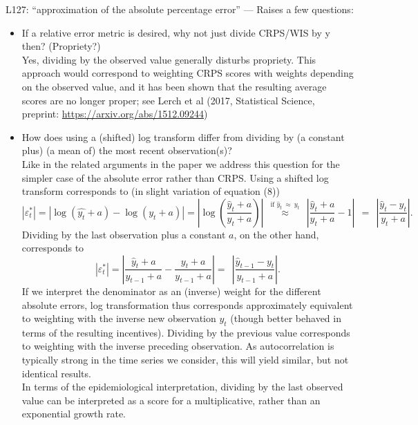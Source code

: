 \documentclass{article}
\newcommand{\black}{\color{black}}
\newcommand{\blue}{\color{blue}}
\begin{document}
L127: “approximation of the absolute percentage error” — Raises a few questions:
\begin{itemize}
    \item If a relative error metric is desired, why not just divide CRPS/WIS by y then? (Propriety?)\\
    \black
Yes, dividing by the observed value generally disturbs propriety. This approach would correspond to weighting CRPS scores with weights depending on the observed value, and it has been shown that the resulting average scores are no longer proper; see Lerch et al (2017, Statistical Science, preprint: \url{https://arxiv.org/abs/1512.09244})
    \item \blue How does using a (shifted) log transform differ from dividing by (a constant plus) (a mean of) the most recent observation(s)?\\
    \black Like in the related arguments in the paper we address this question for the simpler case of the absolute error rather than CRPS. Using a shifted log transform corresponds to (in slight variation of equation (8))
    \begin{equation}
    |\varepsilon^*_t| = |\log (\hat{y_t} + a) - \log(y_t + a)| = \left|\log\left(\frac{\hat{y}_t + a}{y_t + a}\right) \right| \ \ \stackrel{\text{if } \hat{y}_t \ \approx \ y_t}{\approx} \ \ \left| \frac{\hat{y}_t + a}{y_t + a} - 1 \right| \ \ = \ \ \left| \frac{\hat{y}_t - y_t}{y_t + a} \right|.
    \end{equation}
    Dividing by the last observation plus a constant $a$, on the other hand, corresponds to
    \begin{equation}
    |\varepsilon^*_t| = \left|\frac{\hat{y}_t + a}{y_{t - 1} + a} - \frac{y_t + a}{y_{t - 1} + a} \right| = \ \ \left| \frac{\hat{y}_{t - 1} - y_t}{y_{t - 1} + a} \right|.
    \end{equation}
    If we interpret the denominator as an (inverse) weight for the different absolute errors, log transformation thus corresponds approximately equivalent to weighting with the inverse new observation $y_t$ (though better behaved in terms of the resulting incentives). Dividing by the previous value corresponds to weighting with the inverse preceding observation. As autocorrelation is typically strong in the time series we consider, this will yield similar, but not identical results.\\
    In terms of the epidemiological  interpretation, dividing by the last observed value can be interpreted as a score for a multiplicative, rather than an exponential growth rate. %

\end{itemize}
\end{document}

